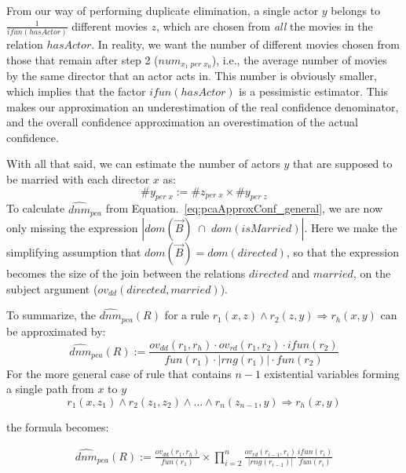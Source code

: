 From our way of performing duplicate elimination, a single actor $y$ belongs to $\frac{1}{ifun(hasActor)}$ different movies $z$, 
which are chosen from \emph{all} the movies in the relation $hasActor$.
In reality, we want the number of different movies chosen from those that remain after step 2 ($num_{x_1\; per \; x_0}$), %
i.e., the average number of movies by the same director that an actor acts in. This number is obviously smaller, which
implies that the factor $ifun(hasActor)$ is a pessimistic estimator. This makes 
our approximation an underestimation of the real confidence denominator, 
and the overall confidence approximation an overestimation of the actual confidence.

With all that said, we can estimate the number of actors $y$ that are supposed to be married with each director $x$ as:
$$
 \#y_{per\;x} :=  \#z_{per \; x} \times \#y_{ per \; z}
$$
\noindent To calculate $\widehat{dnm}_{pca}$ from Equation.~\ref{eq:pcaApproxConf_general}, we are now only missing 
the expression $|dom(\vec{B})\;\cap\;dom(isMarried)|$. 
Here we make the simplifying assumption that $dom(\vec{B}) = dom(directed)$, so that the expression
becomes the size of the join between the relations $directed$ and $married$, on the subject argument ($ov_{dd}(directed,married)$).

To summarize, the $ \widehat{dnm}_{pca}(R)$ for a rule $r_1(x,z)\wedge r_2(z,y) \Rightarrow r_h(x,y)$ can be approximated by:
\[
  \widehat{dnm}_{pca}(R) := \frac{ov_{dd}(r_1,r_h) \cdot ov_{rd}(r_1,r_2) \cdot ifun(r_2)  }{fun(r_1) \cdot |rng(r_1)| \cdot fun(r_2)}
\]
For the more general case of rule that contains $n-1$ existential variables forming a single path from $x$ to $y$
$$
  r_1(x,z_1) \wedge r_2(z_1,z_2) \wedge ... \wedge r_n(z_{n-1},y) \Rightarrow r_h(x,y)
$$

\noindent the formula becomes:

\begin{eqnarray*}
  \widehat{dnm}_{pca}(R) := \frac{ov_{dd}(r_1,r_h)}{fun(r_1)}  \times 
  \prod_{i=2}^{n}\frac{ov_{rd}(r_{i-1},r_i) }{|rng(r_{i-1})|}\frac{ifun(r_i)}{fun(r_i)}
\end{eqnarray*}

